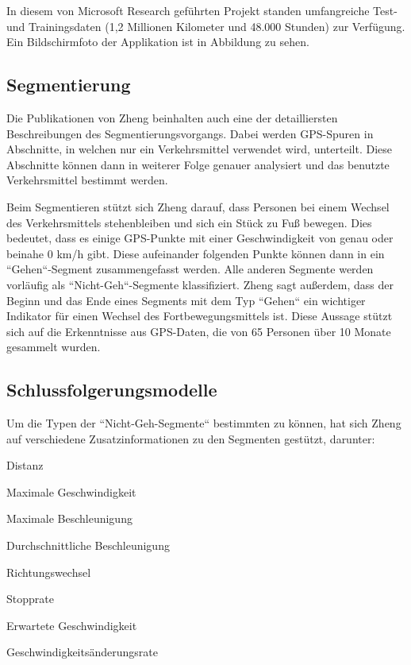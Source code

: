 In diesem von Microsoft Research geführten Projekt standen umfangreiche Test- und Trainingsdaten (1,2 Millionen Kilometer und 48.000 Stunden) zur Verfügung. \cite{microsoft_research_geolife_2015} Ein Bildschirmfoto der Applikation ist in Abbildung  zu sehen. 

\subsection{Segmentierung}
Die Publikationen von Zheng beinhalten auch eine der detailliersten Beschreibungen des Segmentierungsvorgangs. Dabei werden GPS-Spuren in Abschnitte, in welchen nur ein Verkehrsmittel verwendet wird, unterteilt. Diese Abschnitte können dann in weiterer Folge genauer analysiert und das benutzte Verkehrsmittel bestimmt werden.

Beim Segmentieren stützt sich Zheng darauf, dass Personen bei einem Wechsel des Verkehrsmittels stehenbleiben und sich ein Stück zu Fuß bewegen. Dies bedeutet, dass es einige GPS-Punkte mit einer Geschwindigkeit von genau oder beinahe 0 km/h gibt. Diese aufeinander folgenden Punkte können dann in ein ``Gehen``-Segment zusammengefasst werden. Alle anderen Segmente werden vorläufig als ``Nicht-Geh``-Segmente klassifiziert. Zheng sagt außerdem, dass der Beginn und das Ende eines Segments mit dem Typ ``Gehen`` ein wichtiger Indikator für einen Wechsel des Fortbewegungsmittels ist. Diese Aussage stützt sich auf die Erkenntnisse aus GPS-Daten, die von 65 Personen über 10 Monate gesammelt wurden.

\subsection{Schlussfolgerungsmodelle} \label{schlussfolgerungsmodelle}
Um die Typen der ``Nicht-Geh-Segmente`` bestimmten zu können, hat sich Zheng auf verschiedene Zusatzinformationen zu den Segmenten gestützt, darunter:

\begin{pitemize}
\item Distanz
\item Maximale Geschwindigkeit
\item Maximale Beschleunigung
\item Durchschnittliche Beschleunigung
\item Richtungswechsel
\item Stopprate
\item Erwartete Geschwindigkeit
\item Geschwindigkeitsänderungsrate
\end{pitemize}

